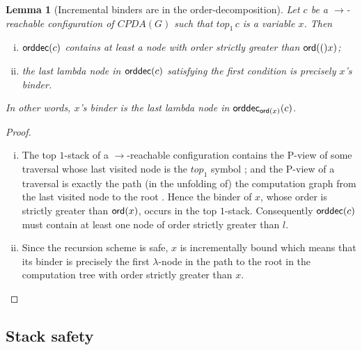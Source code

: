 \documentclass[a4paper]{article}
\newtheorem{lemma}{Lemma}[section]
\theoremstyle{remark}
\theoremstyle{definition}
\newcommand\orddec{{\sf orddec}}
\begin{document}
\begin{lemma}[Incremental binders are in the order-decomposition]
\label{lem:binder_in_ordecompos} Let $c$ be a $\rightarrow$-reachable
configuration of $CPDA(G)$ such that $top_1\,c$ is a variable $x$. Then
\begin{enumerate}[i.]
\item $\orddec(c)$ contains at least a node with order strictly greater than ${\sf ord}(()x)$;
\item the last lambda node in $\orddec(c)$ satisfying the first condition is precisely $x$'s binder.
\end{enumerate}
In other words, $x$'s binder is the last lambda node in $\orddec_{\ord x}(c)$.
\end{lemma}
\begin{proof}
\begin{enumerate}[i.]
\item The top $1$-stack of a $\rightarrow$-reachable configuration contains the P-view of some traversal whose last visited node is the $top_1$ symbol \cite[Corollary 8]{hague-collaps-full}; and
    the P-view of a traversal is exactly the path (in the unfolding of) the
    computation graph from the last visited node to
    the root \cite[Proposition 6]{OngLics2006}. Hence the binder of $x$, whose order
    is strictly greater than ${\sf ord}(x)$, occurs in the top $1$-stack.
    Consequently $\orddec(c)$ must contain at least one node of order strictly greater than $l$.

\item Since the recursion scheme is safe, $x$ is
 incrementally bound \cite{blumong:safelambdacalculus}
 which means that its binder is precisely the first $\lambda$-node in the
 path to the root in the computation tree with order strictly
 greater than $x$. \qedhere
\end{enumerate}
\end{proof}

\subsection{Stack safety}
\end{document}
